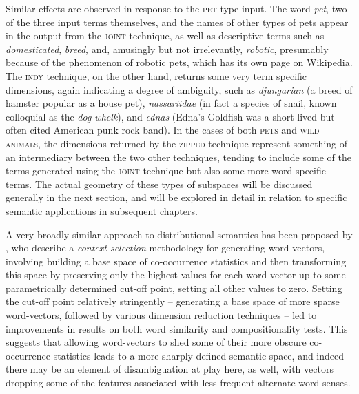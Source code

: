 Similar effects are observed in response to the \textsc{pet} type input.  The word \emph{pet}, two of the three input terms themselves, and the names of other types of pets appear in the output from the \textsc{joint} technique, as well as descriptive terms such as \emph{domesticated}, \emph{breed}, and, amusingly but not irrelevantly, \emph{robotic}, presumably because of the phenomenon of robotic pets, which has its own page on Wikipedia.  The \textsc{indy} technique, on the other hand, returns some very term specific dimensions, again indicating a degree of ambiguity, such as \emph{djungarian} (a breed of hamster popular as a house pet), \emph{nassariidae} (in fact a species of snail, known colloquial as the \emph{dog whelk}), and \emph{ednas} (Edna's Goldfish was a short-lived but often cited American punk rock band).  In the cases of both \textsc{pets} and \textsc{wild animals}, the dimensions returned by the \textsc{zipped} technique represent something of an intermediary between the two other techniques, tending to include some of the terms generated using the \textsc{joint} technique but also some more word-specific terms.  The actual geometry of these types of subspaces will be discussed generally in the next section, and will be explored in detail in relation to specific semantic applications in subsequent chapters.

A very broadly similar approach to distributional semantics has been proposed by \cite{PolajnarEA2014}, who describe a \emph{context selection} methodology for generating word-vectors, involving building a base space of co-occurrence statistics and then transforming this space by preserving only the highest values for each word-vector up to some parametrically determined cut-off point, setting all other values to zero.  Setting the cut-off point relatively stringently -- generating a base space of more sparse word-vectors, followed by various dimension reduction techniques -- led to improvements in results on both word similarity and compositionality tests.  This suggests that allowing word-vectors to shed some of their more obscure co-occurrence statistics leads to a more sharply defined semantic space, and indeed there may be an element of disambiguation at play here, as well, with vectors dropping some of the features associated with less frequent alternate word senses.

